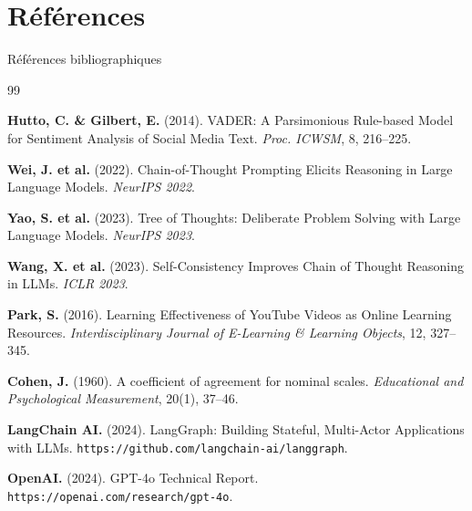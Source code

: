 \documentclass[aspectratio=169, 12pt]{beamer}
\begin{document}
\section*{Références}
\begin{frame}[allowframebreaks]{Références bibliographiques}
  \footnotesize
  \setlength{\parskip}{4pt}
  \begin{thebibliography}{99}

      \textbf{Hutto, C. \& Gilbert, E.} (2014).
      VADER: A Parsimonious Rule-based Model for Sentiment Analysis of
      Social Media Text.
      \textit{Proc. ICWSM}, 8, 216--225.

      \textbf{Wei, J. et al.} (2022).
      Chain-of-Thought Prompting Elicits Reasoning in Large Language Models.
      \textit{NeurIPS 2022}.

      \textbf{Yao, S. et al.} (2023).
      Tree of Thoughts: Deliberate Problem Solving with Large Language Models.
      \textit{NeurIPS 2023}.

      \textbf{Wang, X. et al.} (2023).
      Self-Consistency Improves Chain of Thought Reasoning in LLMs.
      \textit{ICLR 2023}.

      \textbf{Park, S.} (2016).
      Learning Effectiveness of YouTube Videos as Online Learning Resources.
      \textit{Interdisciplinary Journal of E-Learning \& Learning Objects},
      12, 327--345.

      \textbf{Cohen, J.} (1960).
      A coefficient of agreement for nominal scales.
      \textit{Educational and Psychological Measurement}, 20(1), 37--46.

      \textbf{LangChain AI.} (2024).
      LangGraph: Building Stateful, Multi-Actor Applications with LLMs.
      \texttt{https://github.com/langchain-ai/langgraph}.

      \textbf{OpenAI.} (2024).
      GPT-4o Technical Report.
      \texttt{https://openai.com/research/gpt-4o}.

  \end{thebibliography}
\end{frame}

\end{document}
